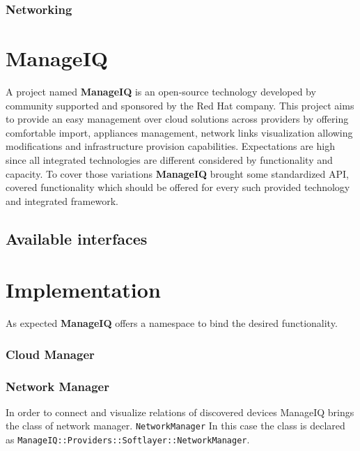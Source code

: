 \subsection{Networking}
\label{sub:Networking}



\chapter{ManageIQ}
\label{chap:ManageIQ}

A project named \textbf{ManageIQ} is an open-source technology developed by community supported and sponsored by the Red Hat company. This project aims to provide an easy management over cloud solutions across providers by offering comfortable import, appliances management, network links visualization allowing modifications and infrastructure provision capabilities. Expectations are high since all integrated technologies are different considered by functionality and capacity. To cover those variations \textbf{ManageIQ} brought some standardized API, covered functionality which should be offered for every such provided technology and integrated framework.

\section{Available interfaces}
\label{sec:Available interfaces}

\chapter{Implementation}
\label{chap:Implemented scheme}

As expected \textbf{ManageIQ} offers a namespace to bind the desired functionality.

\subsection{Cloud Manager}
\label{sub:Cloud Manager}



\subsection{Network Manager}
\label{sub:Network Manager}

In order to connect and visualize relations of discovered devices ManageIQ brings the class of network manager. \texttt{NetworkManager} In this case the class is declared as \texttt{ManageIQ::Providers::Softlayer::NetworkManager}.
